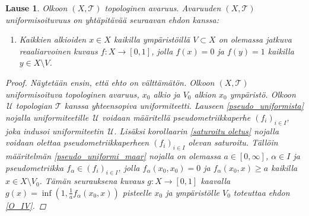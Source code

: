 \documentclass[12pt,a4paper,leqno]{report}
\newcommand{\U}{\,\mathcal{U}}
\newcommand{\T}{\mathcal{T}}
\theoremstyle{plain}
\newtheorem{lause}[equation]{Lause}
\theoremstyle{definition}
\theoremstyle{remark}
\begin{document}
\begin{lause}
Olkoon $(X,\T)$ topologinen avaruus.
Avaruuden $(X,\T)$ uniformisoituvuus on yhtäpitävää seuraavan ehdon kanssa:
\begin{enumerate} [label=(Z),ref=(Z)]
\item\label{O_IV} Kaikkien alkioiden $x\in X$ kaikilla 
ympäristöillä $V\subset X$ on olemassa jatkuva 
reaaliarvoinen kuvaus $f\colon X\rightarrow [0,1]$, 
jolla $f(x)=0$ ja $f(y)=1$ kaikilla $y\in X\setminus V$.
\end{enumerate}
\begin{proof}
Näytetään ensin, että ehto on välttämätön. 
Olkoon $(X,\T)$ uniformisoituva topologinen avaruus, $x_0$ alkio ja $V_0$ alkion $x_0$ ympäristö. Olkoon $\U$ topologian $\T$ kanssa yhteensopiva uniformiteetti. 
Lauseen \ref{pseudo_uniformista} nojalla uniformiteetille $\U$ voidaan 
määritellä pseudometriikkaperhe $(f_i)_{i\in I}$, joka indusoi uniformiteetin $\U$. 
Lisäksi korollaarin \ref{saturoitu oletus} nojalla voidaan olettaa 
pseudometriikkaperheen $(f_i)_{i\in I}$ olevan saturoitu. 
Tällöin määritelmän \ref{pseudo_uniformi_maar} nojalla on olemassa $ a\in[0,\infty]$, $\alpha\in I$ 
ja pseudometriikka $f_\alpha\in (f_i)_{i\in I}$, 
jolla $f_\alpha(x_0,x_0)=0$ ja $f_\alpha (x_0,x)\geq a$ kaikilla $x\in X\setminus V_0$. 
Tämän seurauksena kuvaus $g\colon X\to [0,1]$ kaavalla $g(x)=\inf \left( 1,\frac{1}{a}f_\alpha(x_0,x) \right)$ 
pisteelle $x_0$ ja ympäristölle $V_0$ toteuttaa ehdon \ref{O_IV}.


\end{proof}
\end{lause}
\end{document}
